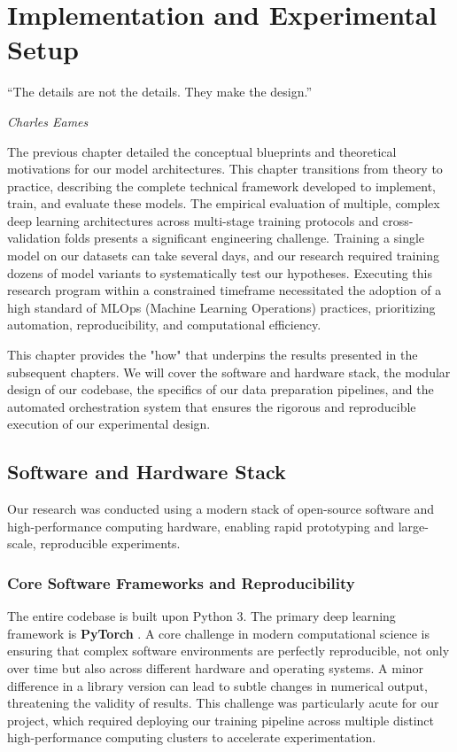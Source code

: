 \chapter{Implementation and Experimental Setup}
\label{c:implementation}

\epigraph{\enquote{The details are not the details. They make the design.}}{\emph{Charles Eames}}

The previous chapter detailed the conceptual blueprints and theoretical motivations for our model architectures. This chapter transitions from theory to practice, describing the complete technical framework developed to implement, train, and evaluate these models. The empirical evaluation of multiple, complex deep learning architectures across multi-stage training protocols and cross-validation folds presents a significant engineering challenge. Training a single model on our datasets can take several days, and our research required training dozens of model variants to systematically test our hypotheses. Executing this research program within a constrained timeframe necessitated the adoption of a high standard of MLOps (Machine Learning Operations) practices, prioritizing automation, reproducibility, and computational efficiency.

This chapter provides the "how" that underpins the results presented in the subsequent chapters. We will cover the software and hardware stack, the modular design of our codebase, the specifics of our data preparation pipelines, and the automated orchestration system that ensures the rigorous and reproducible execution of our experimental design.

\section{Software and Hardware Stack}
\label{sec:impl_stack}
Our research was conducted using a modern stack of open-source software and high-performance computing hardware, enabling rapid prototyping and large-scale, reproducible experiments.

\subsection{Core Software Frameworks and Reproducibility}
The entire codebase is built upon Python 3. The primary deep learning framework is \textbf{PyTorch} \cite{paszke2019pytorch}. A core challenge in modern computational science is ensuring that complex software environments are perfectly reproducible, not only over time but also across different hardware and operating systems. A minor difference in a library version can lead to subtle changes in numerical output, threatening the validity of results. This challenge was particularly acute for our project, which required deploying our training pipeline across multiple distinct high-performance computing clusters to accelerate experimentation.

